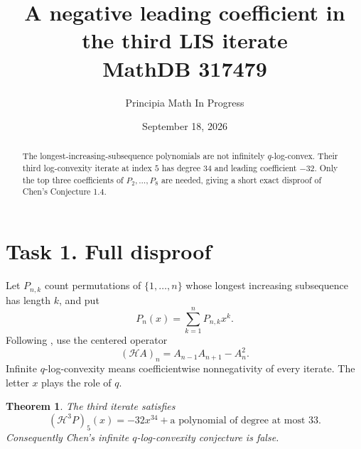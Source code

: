 \documentclass[11pt]{article}
\title{A negative leading coefficient in the third LIS iterate\\\large MathDB 317479}
\author{Principia Math In Progress}
\date{September 18, 2026}
\newtheorem{theorem}{Theorem}
\newcommand{\HH}{\mathcal H}
\begin{document}
\maketitle
\begin{abstract}
The longest-increasing-subsequence polynomials are not infinitely
$q$-log-convex. Their third log-convexity iterate at index $5$
has degree $34$ and leading coefficient $-32$. Only the top
three coefficients of $P_2,\ldots,P_8$ are needed, giving a short
exact disproof of Chen's Conjecture 1.4.
\end{abstract}

\section*{Task 1. Full disproof}
Let $P_{n,k}$ count permutations of $\{1,\ldots,n\}$ whose
longest increasing subsequence has length $k$, and put
\[
 P_n(x)=\sum_{k=1}^nP_{n,k}x^k.
\]
Following \cite[p.~5]{Chen}, use the centered operator
\[
 (\HH A)_n=A_{n-1}A_{n+1}-A_n^2.
\]
Infinite $q$-log-convexity means coefficientwise nonnegativity
of every iterate. The letter $x$ plays the role of $q$.

\begin{theorem}
The third iterate satisfies
\[
 (\HH^3P)_5(x)=-32x^{34}+\text{a polynomial of degree at most }33.
                                                               \tag{1}
\]
Consequently Chen's infinite $q$-log-convexity conjecture is false.
\end{theorem}
\end{document}
